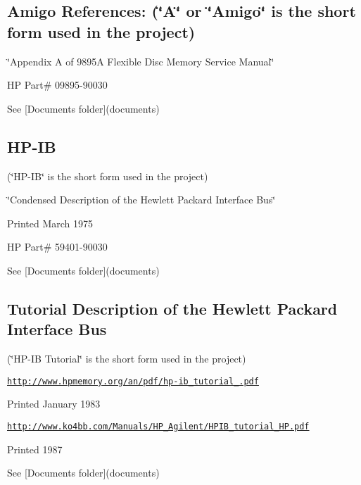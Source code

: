  \subsection*{Amigo References\+: (\char`\"{}\+A\char`\"{} or \char`\"{}\+Amigo\char`\"{} is the short form used in the project)}


\begin{DoxyItemize}
\item \char`\"{}\+Appendix A of 9895\+A Flexible Disc Memory Service Manual\char`\"{}
\item HP Part\# 09895-\/90030
\item See \mbox{[}Documents folder\mbox{]}(documents)
\end{DoxyItemize}



 \subsection*{H\+P-\/\+IB}


\begin{DoxyItemize}
\item (\char`\"{}\+H\+P-\/\+I\+B\char`\"{} is the short form used in the project)
\item \char`\"{}\+Condensed Description of the Hewlett Packard Interface Bus\char`\"{}
\item Printed March 1975
\item HP Part\# 59401-\/90030
\item See \mbox{[}Documents folder\mbox{]}(documents)
\end{DoxyItemize}



 \subsection*{Tutorial Description of the Hewlett Packard Interface Bus}


\begin{DoxyItemize}
\item (\char`\"{}\+H\+P-\/\+I\+B Tutorial\char`\"{} is the short form used in the project)
\item \href{http://www.hpmemory.org/an/pdf/hp-ib_tutorial_1980.pdf}{\tt http\+://www.\+hpmemory.\+org/an/pdf/hp-\/ib\+\_\+tutorial\+\_.\+pdf}
\item Printed January 1983
\item \href{http://www.ko4bb.com/Manuals/HP_Agilent/HPIB_tutorial_HP.pdf}{\tt http\+://www.\+ko4bb.\+com/\+Manuals/\+H\+P\+\_\+\+Agilent/\+H\+P\+I\+B\+\_\+tutorial\+\_\+\+H\+P.\+pdf}
\item Printed 1987
\item See \mbox{[}Documents folder\mbox{]}(documents)
\end{DoxyItemize}



